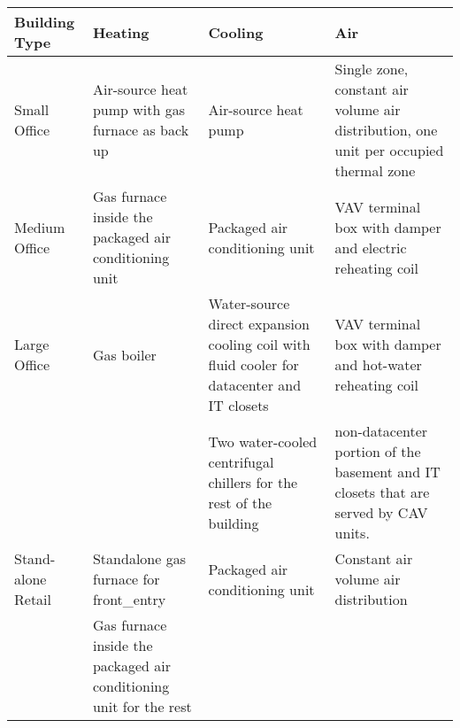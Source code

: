 \pagebreak
\begin{table}[h!]
\centering
\tiny
\caption{Prototype Building HVAC System}
\label{tab:hvac}
\begin{longtable}{p{2cm}|p{2cm}|p{4cm}|p{4cm}}
  \hline
  Building Type                & Heating                                                                         & Cooling                                                                      & Air                                                                                                                                                                    \\
  \hline
  \hline
  Small Office                 & Air-source heat pump with gas furnace as back up                                & Air-source heat pump                                                         & Single zone, constant air volume air distribution, one unit per occupied thermal zone                                                                                  \\
  \hline
  Medium Office                & Gas furnace inside the packaged air conditioning unit                           & Packaged air conditioning unit                                               & VAV terminal box with damper and electric reheating coil                                                                                                               \\
  \hline
  Large Office                 & Gas boiler                                                                      & Water-source direct expansion cooling coil with fluid cooler for datacenter and IT closets & VAV terminal box with damper and hot-water reheating coil                                                                                                              \\
                               &                                                                                 & Two water-cooled centrifugal chillers for the rest of the building           & non-datacenter portion of the basement and IT closets that are served by CAV units.                                                                                    \\
  \hline
  Stand-alone Retail           & Standalone gas furnace for front\_entry                                         & Packaged air conditioning unit                                               & Constant air volume air distribution                                                                                                                                   \\ & Gas furnace inside the packaged air conditioning unit for the rest              &                                                                              &                                                                                                                                                                        \\

\end{longtable}
\end{table}
